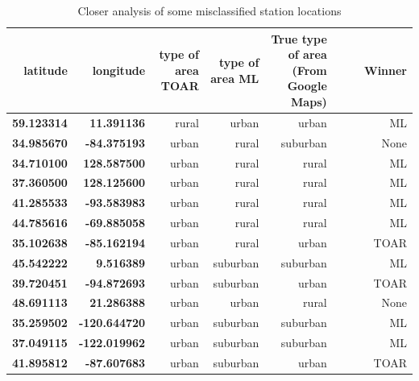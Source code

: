 \documentclass[gmd, manuscript]{copernicus}
\begin{document}
\begin{table}[htb!]
\centering
\caption{Closer analysis of some misclassified station locations}
\begin{tabular}{|r|r|r|r|r|r|}
\hline
latitude           & longitude            & type of area TOAR & type of area ML & True type of area (From Google Maps)& ~~~~Winner \\ \hline
\textbf{59.123314} & \textbf{ 11.391136}   & rural             & urban           & urban             & ML     \\ \hline
\textbf{34.985670} & \textbf{-84.375193}  & urban             & rural           & suburban          & None   \\ \hline
\textbf{34.710100} & \textbf{128.587500}  & urban             & rural           & rural             & ML     \\ \hline
\textbf{37.360500} & \textbf{128.125600}  & urban             & rural           & rural             & ML     \\ \hline
\textbf{41.285533} & \textbf{-93.583983}  & urban             & rural           & rural             & ML     \\ \hline
\textbf{44.785616} & \textbf{-69.885058}  & urban             & rural           & rural             & ML     \\ \hline
\textbf{35.102638} & \textbf{-85.162194}  & urban             & rural           & urban             & TOAR   \\ \hline
\textbf{45.542222} & \textbf{9.516389}    & urban             & suburban        & suburban          & ML     \\ \hline
\textbf{39.720451} & \textbf{-94.872693}  & urban             & suburban        & urban             & TOAR   \\ \hline
\textbf{48.691113} & \textbf{21.286388}   & urban             & urban           & rural             & None   \\ \hline
\textbf{35.259502} & \textbf{-120.644720} & urban             & suburban        & suburban          & ML     \\ \hline
\textbf{37.049115} & \textbf{-122.019962} & urban             & suburban        & suburban          & ML     \\ \hline
\textbf{41.895812} & \textbf{-87.607683}  & urban             & suburban        & urban             & TOAR   \\ \hline

\end{tabular}
\end{table}
\end{document}
